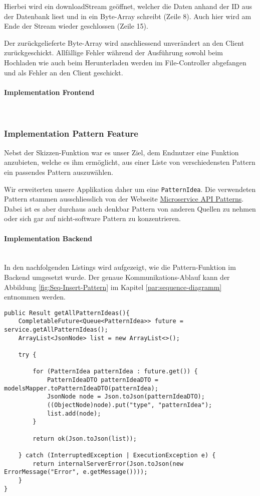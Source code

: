 Hierbei wird ein downloadStream geöffnet, welcher die Daten anhand der ID aus der Datenbank liest und in ein Byte-Array schreibt (Zeile 8). Auch hier wird am Ende der Stream wieder geschlossen (Zeile 15).

Der zurückgelieferte Byte-Array wird anschliessend unverändert an den Client zurück\-geschickt. Allfällige Fehler während der Ausführung sowohl beim Hochladen wie auch beim Herunterladen werden im File-Controller abgefangen und als Fehler an den Client geschickt.

\paragraph*{Implementation Frontend}~\\

\subsubsection{Implementation Pattern Feature}
Nebst der Skizzen-Funktion war es unser Ziel, dem Endnutzer eine Funktion anzubieten, welche es ihm ermöglicht, aus einer Liste von verschiedensten Pattern ein passendes Pattern auszuwählen. 

Wir erweiterten unsere Applikation daher um eine \texttt{PatternIdea}. Die verwendeten Pattern stammen ausschliesslich von der Webseite \href{https://microservice-api-patterns.org}{Microservice API Patterns}. Dabei ist es aber durchaus auch denkbar Pattern von anderen Quellen zu nehmen oder sich gar auf nicht-software Pattern zu konzentrieren.

\paragraph*{Implementation Backend}~\\
In den nachfolgenden Listings wird aufgezeigt, wie die Pattern-Funktion im Backend umgesetzt wurde.
Der genaue Kommunikations-Ablauf kann der Abbildung \ref{fig:Seq-Insert-Pattern} im Kapitel \ref{par:sequence-diagramm} entnommen werden.

\begin{lstlisting}[caption={Alle Pattern holen im Pattern Controller}, label=getAllPatternInController]
 public Result getAllPatternIdeas(){
    CompletableFuture<Queue<PatternIdea>> future = service.getAllPatternIdeas();
    ArrayList<JsonNode> list = new ArrayList<>();

    try {

        for (PatternIdea patternIdea : future.get()) {
            PatternIdeaDTO patternIdeaDTO = modelsMapper.toPatternIdeaDTO(patternIdea);
            JsonNode node = Json.toJson(patternIdeaDTO);
            ((ObjectNode)node).put("type", "patternIdea");
            list.add(node);
        }

        return ok(Json.toJson(list));

    } catch (InterruptedException | ExecutionException e) {
        return internalServerError(Json.toJson(new ErrorMessage("Error", e.getMessage())));
    }
}
\end{lstlisting}


